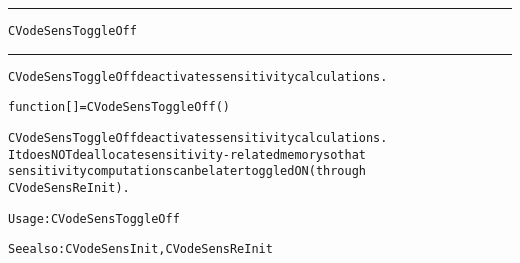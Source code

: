\begin{samepage}
\hrule
\begin{center}
{\large \verb!CVodeSensToggleOff!}
\label{p:CVodeSensToggleOff}
\end{center}
\hrule\vspace{0.1in}



\begin{alltt}
CVodeSensToggleOff deactivates sensitivity calculations.
\end{alltt}

\end{samepage}



\begin{samepage}


\begin{alltt}
function [] = CVodeSensToggleOff() 
\end{alltt}

\end{samepage}



\begin{alltt}
 CVodeSensToggleOff deactivates sensitivity calculations.
   It does NOT deallocate sensitivity-related memory so that 
   sensitivity computations can be later toggled ON (through
   CVodeSensReInit).

   Usage: CVodeSensToggleOff

   See also: CVodeSensInit, CVodeSensReInit
\end{alltt}






\vspace{0.1in}